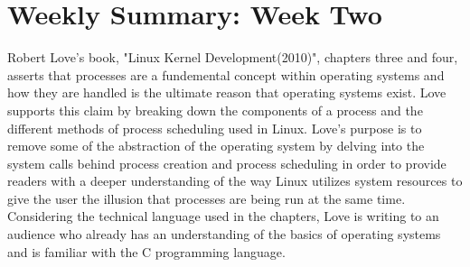 \documentclass[letterpaper,10pt]{article}
\begin{document}
\section{Weekly Summary: Week Two}
Robert Love's book, "Linux Kernel Development(2010)", chapters three and four, asserts that processes are a fundemental concept within operating systems and how they are handled is the ultimate reason that operating systems exist. Love supports this claim by breaking down the components of a process and the different methods of process scheduling used in Linux. Love's purpose is to remove some of the abstraction of the operating system by delving into the system calls behind process creation and process scheduling in order to provide readers with a deeper understanding of the way Linux utilizes system resources to give the user the illusion that processes are being run at the same time. Considering the technical language used in the chapters, Love is writing to an audience who already has an understanding of the basics of operating systems and is familiar with the C programming language.
\end{document}
